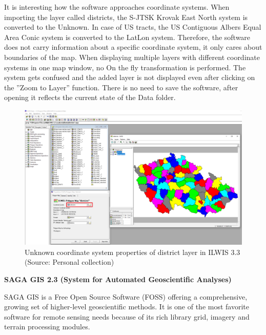 \documentclass[a4paper,10pt,twoside]{article}
\begin{document}
It is interesting how the software approaches coordinate systems. When importing the layer called districts, the S-JTSK Krovak East North system is converted to the Unknown. In case of US tracts, the US Contiguous Albers Equal Area Conic system is converted to the LatLon system. Therefore, the software does not carry information about a specific coordinate system, it only cares about boundaries of the map. When displaying multiple layers with different coordinate systems in one map window, no On the fly transformation is performed. The system gets confused and the added layer is not displayed even after clicking on the ''Zoom to Layer'' function. There is no need to save the software, after opening it reflects the current state of the Data folder.

\vspace{0.3cm}
\begin{figure}[hbt!] 
\begin{center}
\includegraphics[width=17cm]{../pictures/ilwis_pridani_mapy.png} 
\caption[Unknown coordinate system properties of district layer in ILWIS 3.3]{Unknown coordinate system properties of district layer in ILWIS 3.3 (Source: Personal collection)}
\label{fig:ilwis_pridani_mapy}
\end{center}
\end{figure}

\bigskip

\noindent \textbf {SAGA GIS 2.3 (System for Automated Geoscientific Analyses)}

\noindent SAGA GIS is a Free Open Source Software (FOSS) offering a comprehensive, growing set of higher-level geoscientific methods. It is one of the most favorite software for remote sensing needs because of its rich library grid, imagery and terrain processing modules.
\end{document}
